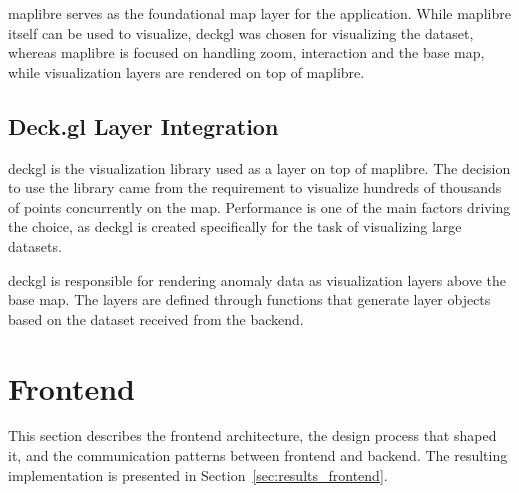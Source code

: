 \gls{maplibre} serves as the foundational map layer for the application. While \gls{maplibre} itself can be used to visualize, \gls{deckgl} was chosen for visualizing the dataset, whereas \gls{maplibre} is focused on handling zoom, interaction and the base map, while visualization layers are rendered on top of \gls{maplibre}.


\subsection{Deck.gl Layer Integration}

\gls{deckgl} is the visualization library used as a layer on top of \gls{maplibre}.
The decision to use the library came from the requirement to visualize hundreds of thousands of points concurrently on the map. Performance is one of the main factors driving the choice, as \gls{deckgl} is created specifically for the task of visualizing large datasets.

\gls{deckgl} is responsible for rendering anomaly data as visualization layers above the base map. The layers are defined through functions that generate layer objects based on the dataset received from the backend.


\section{Frontend}


This section describes the frontend architecture, the design process that shaped it, and the communication patterns between frontend and backend. The resulting implementation is presented in Section~\ref{sec:results_frontend}.

